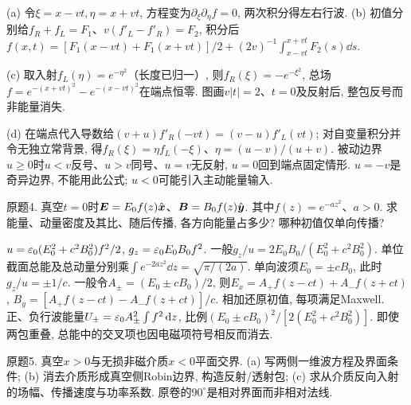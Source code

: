 \begin{solution}
(a) 令$\xi=x-vt,\eta=x+vt$, 方程变为$\partial_\xi\partial_\eta f=0$, 两次积分得左右行波. (b) 初值分别给$f_R+f_L=F_1$、$v(f'_L-f'_R)=F_2$, 积分后
$ f(x,t)=[F_1(x-vt)+F_1(x+vt)]/2+(2v)^{-1}\int_{x-vt}^{x+vt}F_2(s)\dd s$.

(c) 取入射$f_L(\eta)=e^{-\eta^2}$（长度已归一）, 则$f_R(\xi)=-e^{-\xi^2}$, 总场$f=e^{-(x+vt)^2}-e^{-(x-vt)^2}$在端点恒零. 图画$v|t|=2$、$t=0$及反射后, 整包反号而非能量消失.
\begin{center}\end{center}
(d) 在端点代入导数给$(v+u)f'_R(-vt)=(v-u)f'_L(vt)$; 对自变量积分并令无独立常背景, 得$f_R(\xi)=\eta f_L(-\xi)$、$\eta=(u-v)/(u+v)$. 被动边界$u\ge0$时$u<v$反号、$u>v$同号、$u=v$无反射, $u=0$回到端点固定情形. $u=-v$是奇异边界, 不能用此公式; $u<0$可能引入主动能量输入.
\end{solution}
\begin{exercise}
原题4. 真空$t=0$时$\boldsymbol{E}=E_0f(z)\hat{\boldsymbol{x}}$、$\boldsymbol{B}=B_0f(z)\hat{\boldsymbol{y}}$. 其中$f(z)=e^{-az^2}$、$a>0$. 求能量、动量密度及其比、随后传播, 各方向能量占多少? 哪种初值仅单向传播?
\end{exercise}
\begin{solution}
$u=\varepsilon_0(E_0^2+c^2B_0^2)f^2/2$, $g_z=\varepsilon_0 E_0B_0f^2$. 一般$g_z/u=2E_0B_0/(E_0^2+c^2B_0^2)$. 单位截面总能及总动量分别乘$\int e^{-2az^2}\dd z=\sqrt{\pi/(2a)}$. 单向波须$E_0=\pm cB_0$, 此时$g_z/u=\pm1/c$. 一般令$A_\pm=(E_0\pm cB_0)/2$, 则$E_x=A_+f(z-ct)+A_-f(z+ct)$, $B_y=[A_+f(z-ct)-A_-f(z+ct)]/c$. 相加还原初值, 每项满足Maxwell. 正、负行波能量$U_\pm=\varepsilon_0 A_\pm^2\int f^2\,\mathrm d z$, 比例$(E_0\pm cB_0)^2/[2(E_0^2+c^2B_0^2)]$. 即使两包重叠, 总能中的交叉项也因电磁项符号相反而消去.
\end{solution}
\begin{exercise}
原题5. 真空$x>0$与无损非磁介质$x<0$平面交界. (a) 写两侧一维波方程及界面条件; (b) 消去介质形成真空侧Robin边界, 构造反射/透射包; (c) 求从介质反向入射的场幅、传播速度与功率系数. 原卷的$90^\circ$是相对界面而非相对法线.
\end{exercise}
